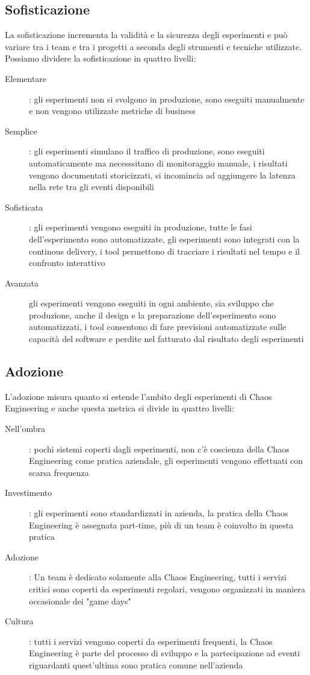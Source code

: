 \subsection{Sofisticazione}
La sofisticazione incrementa la validità e la sicurezza degli esperimenti e può variare tra i team e tra i progetti a seconda degli strumenti e tecniche utilizzate.
Possiamo dividere la sofisticazione in quattro livelli:
\begin{description}
    \item[Elementare]: gli esperimenti non si svolgono in produzione, sono eseguiti manualmente e non vengono utilizzate metriche di business
    \item[Semplice]: gli esperimenti simulano il traffico di produzione, sono eseguiti automaticamente ma necesssitano di monitoraggio manuale, i risultati vengono documentati storicizzati, si incomincia ad aggiungere la latenza nella rete tra gli eventi disponibili
    \item[Sofisticata]: gli esperimenti vengono eseguiti in produzione, tutte le fasi dell'esperimento sono automatizzate, gli esperimenti sono integrati con la continous delivery, i tool permettono di tracciare i risultati nel tempo e il confronto interattivo
    \item[Avanzata] gli esperimenti vengono eseguiti in ogni ambiente, sia sviluppo che produzione, anche il design e la preparazione dell'esperimento sono automatizzati, i tool consentono di fare previsioni automatizzate sulle capacità del software e perdite nel fatturato dal risultato degli esperimenti 
\end{description}

\subsection{Adozione}
L'adozione misura quanto si estende l'ambito degli esperimenti di Chaos Engineering e anche questa metrica si divide in quattro livelli:
\begin{description}
    \item[Nell'ombra]: pochi sistemi coperti dagli esperimenti, non c'è coscienza della Chaos Engineering come pratica aziendale, gli esperimenti vengono effettuati con scarsa frequenza
    \item[Investimento]: gli esperimenti sono standardizzati in azienda, la pratica della Chaos Engineering è assegnata part-time, più di un team è coinvolto in questa pratica
    \item[Adozione]: Un team è dedicato solamente alla Chaos Engineering, tutti i servizi critici sono coperti da esperimenti regolari, vengono organizzati in maniera occasionale dei "game days"
    \item[Cultura]: tutti i servizi vengono coperti da esperimenti frequenti, la Chaos Engineering è parte del processo di sviluppo e la partecipazione ad eventi riguardanti quest'ultima sono pratica comune nell'azienda   
\end{description}

